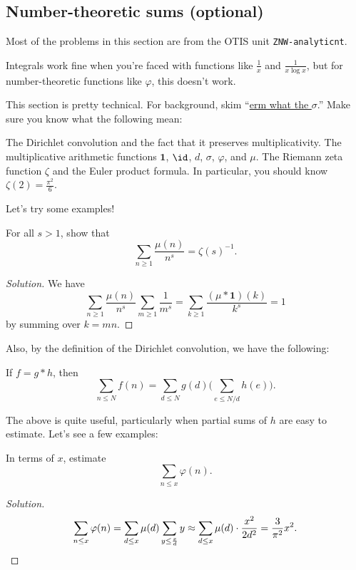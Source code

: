 \documentclass[11pt]{scrartcl}
\renewenvironment{solution}{\renewcommand\qedsymbol{$\blacksquare$}\begin{proof}[Solution]}{\end{proof}}
\begin{document}
\subsection{Number-theoretic sums (optional)}

Most of the problems in this section are from the OTIS unit \verb|ZNW-analyticnt|.

Integrals work fine when you're faced with functions like $\frac1x$ and $\frac1{x \log x}$, but for number-theoretic functions like $\varphi$, this doesn't work.

This section is pretty technical. For background, skim ``\href{https://knowingant.github.io/handouts/nt-sums/nt-sums.pdf}{erm what the $\sigma$}.'' Make sure you know what the following mean:
\begin{itemize}
	\ii The Dirichlet convolution and the fact that it preserves multiplicativity.
	\ii The multiplicative arithmetic functions $\mathbf1$, $\id$, $d$, $\sigma$, $\varphi$, and $\mu$.
	\ii The Riemann zeta function $\zeta$ and the Euler product formula. In particular, you should know $\zeta(2) = \frac{\pi^2}{6}$.
\end{itemize}

Let's try some examples!

\begin{example}
	For all $s > 1$, show that
	\[\sum_{n \ge 1}\frac{\mu(n)}{n^s} = \zeta(s)^{-1}.\]
\end{example}

\begin{solution}
	We have
	\[\sum_{n \ge 1}\frac{\mu(n)}{n^s}\sum_{m \ge 1}\frac1{m^s} = \sum_{k \ge 1}\frac{(\mu \ast \mathbf1)(k)}{k^s} = 1\]
	by summing over $k = mn$.
\end{solution}

Also, by the definition of the Dirichlet convolution, we have the following:

\begin{theorem}
	If $f = g \ast h$, then
	\[\sum_{n \le N}f(n) = \sum_{d \le N}g(d)\biggl( \sum_{e \le N/d}h(e) \biggr).\]
\end{theorem}

The above is quite useful, particularly when partial sums of $h$ are easy to estimate. Let's see a few examples:

\begin{example}
	In terms of $x$, estimate
	\[\sum_{n \le x}\varphi(n).\]
\end{example}

\begin{solution}
	\[\sum_{n \le x}\varphi(n) = \sum_{d \le x}\mu(d)\sum_{y \le \frac xd}y \approx \sum_{d \le x}\mu(d) \cdot \frac{x^2}{2d^2} = \frac3{\pi^2}x^2. \qedhere\]
\end{solution}
\end{document}
